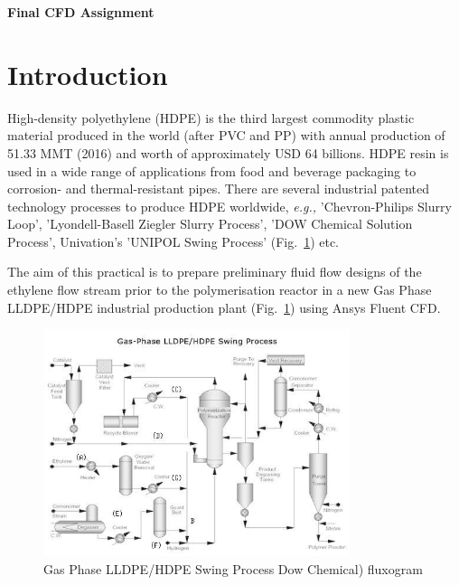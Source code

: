 \documentclass[12pts,a4paper,amsmath,amssymb,floatfix]{article}%
\newcommand{\eg}{{\it e.g., }}
\begin{document}
\begin{center}
  \Large{\bf Final CFD Assignment}
\end{center}


\section{Introduction}
High-density polyethylene (HDPE) is the third largest commodity plastic material produced in the world (after PVC and PP) with annual production of 51.33 MMT (2016) and worth of approximately USD 64 billions. HDPE resin is used in a wide range of applications from food and beverage packaging to corrosion- and thermal-resistant pipes. There are several industrial patented technology processes to produce HDPE worldwide, \eg 'Chevron-Philips Slurry Loop', 'Lyondell-Basell Ziegler Slurry Process', 'DOW Chemical Solution Process', Univation's 'UNIPOL Swing Process' (Fig.~\ref{HDPE_Plant}) etc.

\medskip
The aim of this practical is to prepare preliminary fluid flow designs of the ethylene flow stream prior to the polymerisation reactor in a new Gas Phase LLDPE/HDPE industrial production plant (Fig.~\ref{HDPE_Plant}) using Ansys Fluent CFD.

\begin{figure}[H]
  \begin{center}
     \includegraphics[width=0.8\textwidth,clip]{./Pics/hdpe_production_img2.jpg}
     \caption{Gas Phase LLDPE/HDPE Swing Process Dow Chemical) fluxogram}\label{HDPE_Plant}
  \end{center}
\end{figure}
\end{document}
